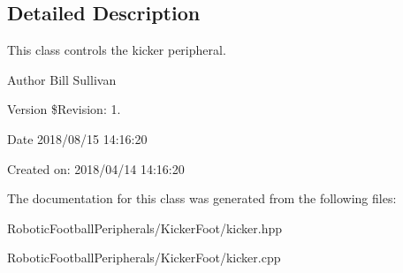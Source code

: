 \subsection{Detailed Description}
This class controls the kicker peripheral. 

\begin{DoxyAuthor}{Author}
Bill Sullivan
\end{DoxyAuthor}
\begin{DoxyVersion}{Version}
\$\+Revision\+: 1.
\end{DoxyVersion}
\begin{DoxyDate}{Date}
2018/08/15 14\+:16\+:20
\end{DoxyDate}
Created on\+: 2018/04/14 14\+:16\+:20 

The documentation for this class was generated from the following files\+:\begin{DoxyCompactItemize}
\item 
Robotic\+Football\+Peripherals/\+Kicker\+Foot/kicker.\+hpp\item 
Robotic\+Football\+Peripherals/\+Kicker\+Foot/kicker.\+cpp\end{DoxyCompactItemize}
